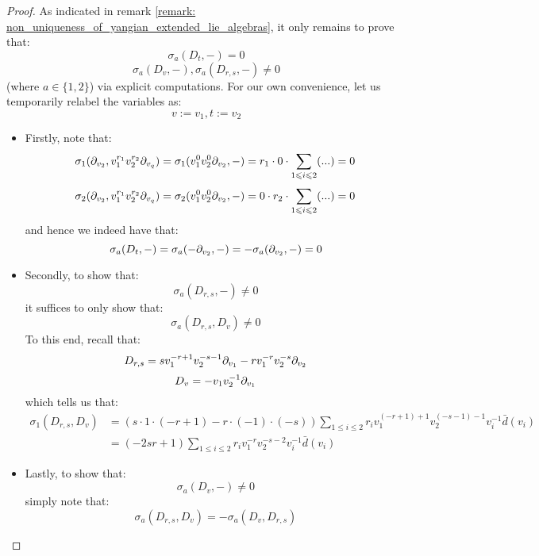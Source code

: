             \begin{proof}
                As indicated in remark \ref{remark: non_uniqueness_of_yangian_extended_lie_algebras}, it only remains to prove that:
                    $$\sigma_a(D_t, -) = 0$$
                    $$\sigma_a(D_v, -), \sigma_a(D_{r, s}, -) \not = 0$$
                (where $a \in \{1, 2\}$) via explicit computations. For our own convenience, let us temporarily relabel the variables as:
                    $$v := v_1, t := v_2$$
                \begin{itemize}
                    \item Firstly, note that:
                        $$\sigma_1(\partial_{v_2}, v_1^{r_1} v_2^{r_2} \partial_{v_q}) = \sigma_1(v_1^0 v_2^0 \partial_{v_2}, -) = r_1 \cdot 0 \cdot \sum_{1 \leqslant i \leqslant 2} (...) = 0$$
                        $$\sigma_2(\partial_{v_2}, v_1^{r_1} v_2^{r_2} \partial_{v_q}) = \sigma_2(v_1^0 v_2^0 \partial_{v_2}, -) = 0 \cdot r_2 \cdot \sum_{1 \leqslant i \leqslant 2} (...) = 0$$
                    and hence we indeed have that:
                        $$\sigma_a(D_t, -) = \sigma_a(-\partial_{v_2}, -) = -\sigma_a(\partial_{v_2}, -) = 0$$
                    \item Secondly, to show that:
                        $$\sigma_a(D_{r, s}, -) \not = 0$$
                    it suffices to only show that:
                        $$\sigma_a(D_{r, s}, D_v) \not = 0$$
                    To this end, recall that:
                        $$D_{r, s} = s v_1^{-r + 1} v_2^{-s - 1} \partial_{v_1} - r v_1^{-r} v_2^{-s} \partial_{v_2}$$
                        $$D_v = -v_1 v_2^{-1} \partial_{v_1}$$
                    which tells us that:
                        $$
                            \begin{aligned}
                                \sigma_1(D_{r, s}, D_v) & = ( s \cdot 1 \cdot (-r + 1) - r \cdot (-1) \cdot (-s) ) \sum_{1 \leq i \leq 2} r_i v_1^{(-r + 1) + 1} v_2^{(-s - 1) - 1} v_i^{-1} \bar{d}(v_i)
                                \\
                                & = (-2sr + 1) \sum_{1 \leq i \leq 2} r_i v_1^{-r} v_2^{-s - 2} v_i^{-1} \bar{d}(v_i)
                            \end{aligned}
                        $$
                    \item Lastly, to show that:
                        $$\sigma_a(D_v, -) \not = 0$$
                    simply note that:
                        $$\sigma_a(D_{r, s}, D_v) = -\sigma_a(D_v, D_{r, s})$$
                \end{itemize}
            \end{proof}

